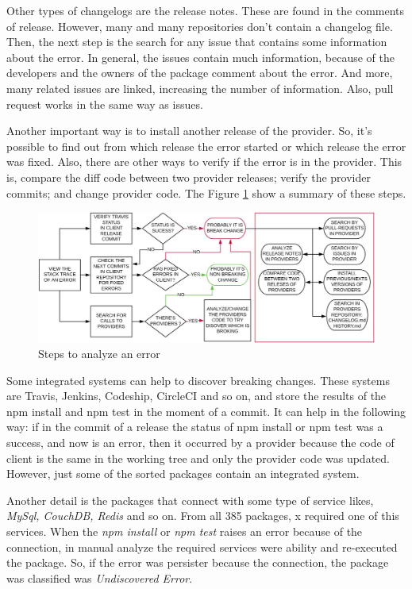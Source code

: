 Other types of changelogs are the release notes. These are found in the comments of release. However, many and many repositories don’t contain a changelog file. Then, the next step is the search for any issue that contains some information about the error. In general, the issues contain much information, because of the developers and the owners of the package comment about the error. And more, many related issues are linked, increasing the number of information. Also, pull request works in the same way as issues.

Another important way is to install another release of the provider. So, it's possible to find out from which release the error started or which release the error was fixed. Also, there are other ways to verify if the error is in the provider. This is, compare the diff code between two provider releases; verify the provider commits; and change provider code.
The Figure \ref{fig:step_analyze} show a summary of these steps.

\begin{figure}
    \centering
    \includegraphics[scale=0.35]{figuras/step_analyze.jpeg}
    \caption{Steps to analyze an error}
    \label{fig:step_analyze}
\end{figure}
Some integrated systems can help to discover breaking changes. These systems are Travis, Jenkins, Codeship, CircleCI and so on, and store the results of the npm install and npm test in the moment of a commit. It can help in the following way: if in the commit of a release the status of npm install or npm test was a success, and now is an error, then it occurred by a provider because the code of client is the same in the working tree and only the provider code was updated. However, just some of the sorted packages contain an integrated system.

Another detail is the packages that connect with some type of service likes, \textit{MySql, CouchDB, Redis} and so on. From all 385 packages, x required one of this services. When the \textit{npm install} or \textit{npm test} raises an error because of the connection, in manual analyze the required services were ability and re-executed the package. So, if the error was persister because the connection, the package was classified was \textit{Undiscovered Error}.

